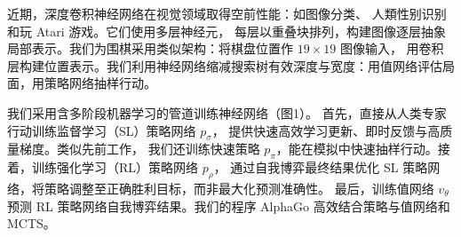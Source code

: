 \documentclass[12pt]{article}
\begin{document}
近期，深度卷积神经网络在视觉领域取得空前性能：如图像分类\cite{krizhevsky2012imagenet}、
人類性别识别\cite{lawrence1997face}和玩 Atari 游戏\cite{mnih2015human}。它们使用多层神经元，
每层以重叠块排列，构建图像逐层抽象局部表示\cite{lecun2015deep}。我们为围棋采用类似架构：将棋盘位置作 $19\times19$ 图像输入，
用卷积层构建位置表示。我们利用神经网络缩减搜索树有效深度与宽度：用值网络评估局面，用策略网络抽样行动。

我们采用含多阶段机器学习的管道训练神经网络（图1）。
首先，直接从人类专家行动训练监督学习（SL）策略网络 $ p_\sigma $，
提供快速高效学习更新、即时反馈与高质量梯度。类似先前工作\cite{coulom2007computing, muller2010fuego}，
我们还训练快速策略 $ p_\pi $，能在模拟中快速抽样行动。接着，训练强化学习（RL）策略网络 $ p_\rho $，
通过自我博弈最终结果优化 SL 策略网络，将策略调整至正确胜利目标，而非最大化预测准确性。
最后，训练值网络 $ v_\theta $ 预测 RL 策略网络自我博弈结果。我们的程序 AlphaGo 高效结合策略与值网络和 MCTS。
\end{document}
